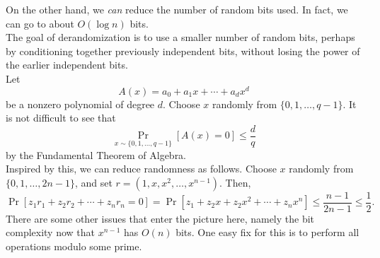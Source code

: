 \documentclass{article}
\begin{document}
On the other hand, we \emph{can} reduce the number of random bits used. In fact, we can go to about $O(\log n)$ bits.\\
The goal of derandomization is to use a smaller number of random bits, perhaps by conditioning together previously independent bits, without losing the power of the earlier independent bits.\\
Let
\[ A(x) = a_0 + a_1x + \cdots + a_{d}x^{d} \]
be a nonzero polynomial of degree $d$. Choose $x$ randomly from $\{0,1,\ldots,q-1\}$. It is not difficult to see that
\[ \Pr_{x \sim \{0,1,\ldots,q-1\}}\left[ A(x) = 0 \right] \le \frac{d}{q} \]
by the Fundamental Theorem of Algebra.\\
Inspired by this, we can reduce randomness as follows. Choose $x$ randomly from $\{0,1,\ldots,2n-1\}$, and set $r = (1,x,x^2,\ldots,x^{n-1})$. Then,
\[ \Pr[ z_1r_1 + z_2r_2 + \cdots + z_nr_n = 0 ] = \Pr\left[ z_1 + z_2x + z_2x^2 + \cdots + z_nx^n \right] \le \frac{n-1}{2n-1} \le \frac{1}{2}. \]
There are some other issues that enter the picture here, namely the bit complexity now that $x^{n-1}$ has $O(n)$ bits. One easy fix for this is to perform all operations modulo some prime.
\end{document}
